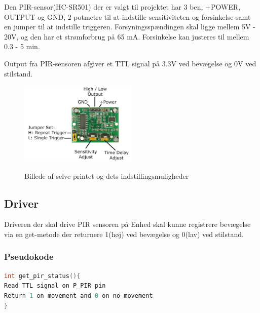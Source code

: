 Den PIR-sensor(HC-SR501) der er valgt til projektet har 3 ben, +POWER, OUTPUT og GND, 2 potmetre til at indstille sensitiviteten og forsinkelse samt en jumper til at indstille triggeren. Forsyningsspændingen skal ligge mellem 5V - 20V, og den har et strømforbrug på 65 mA. Forsinkelse kan justeres til mellem 0.3 - 5 min.

Output fra PIR-sensoren afgiver et TTL signal på 3.3V ved bevægelse og 0V ved stilstand.

\begin{figure}[H] \centering
{\includegraphics[width=0.5\textwidth]{filer/design/Billeder/pir_overview}}
\caption{Billede af selve printet og dets indstillingsmuligheder}
\label{lab:pir_overview}
\raggedright
\end{figure}

\subsection*{Driver}

Driveren der skal drive PIR sensoren på Enhed skal kunne registrere bevægelse via en get-metode der returnere 1(høj) ved bevægelse og 0(lav) ved stilstand.

\subsubsection*{Pseudokode}

\begin{lstlisting}[language=C]
int get_pir_status(){
Read TTL signal on P_PIR pin
Return 1 on movement and 0 on no movement
}
\end{lstlisting}